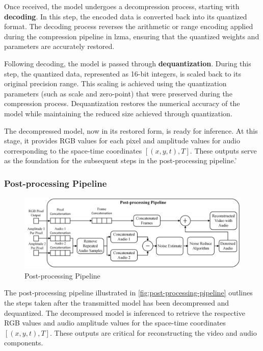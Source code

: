 \documentclass{ioereport}
\begin{document}
        Once received, the model undergoes a decompression process, starting with \textbf{decoding}. In this step, the encoded data is converted back into its quantized format. The decoding process reverses the arithmetic or range encoding applied during the compression pipeline in \gls{lzma}, ensuring that the quantized weights and parameters are accurately restored.

        Following decoding, the model is passed through \textbf{dequantization}. During this step, the quantized data, represented as 16-bit integers, is scaled back to its original precision range. This scaling is achieved using the quantization parameters (such as scale and zero-point) that were preserved during the compression process. Dequantization restores the numerical accuracy of the model while maintaining the reduced size achieved through quantization.

        The decompressed model, now in its restored form, is ready for inference. At this stage, it provides RGB values for each pixel and amplitude values for audio corresponding to the space-time coordinates $\left[(x, y, t), T\right]$. These outputs serve as the foundation for the subsequent steps in the post-processing pipeline.'

        \subsubsection{Post-processing Pipeline}
        \begin{figure}[H]
            \centering
            \includegraphics[width=0.9\linewidth]{assets/Major Data Post-Processing.png}
            \caption{Post-processing Pipeline}
            \label{fig:post-processing-pipeline}
        \end{figure}
        The post-processing pipeline illustrated in \autoref{fig:post-processing-pipeline} outlines the steps taken after the transmitted model has been decompressed and dequantized. The decompressed model is inferenced to retrieve the respective RGB values and audio amplitude values for the space-time coordinates $\left[(x, y, t), T\right]$. These outputs are critical for reconstructing the video and audio components.
\end{document}
